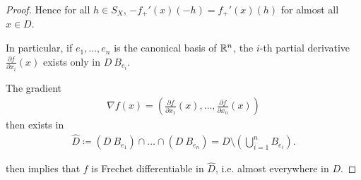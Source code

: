 \begin{proof}
  Hence for all $h \in S_X$, $-f_+'(x)(-h) = f_+'(x)(h)$ for almost all $x \in D$.

  In particular, if $e_1, \ldots, e_n$ is the canonical basis of $\mathbb R^n$, the $i$-th partial derivative $\frac{\partial f} {\partial x_i} (x)$ exists only in $D \ B_{e_i}$.

  The gradient
  \begin{align*}
    \nabla f(x) = \left( \frac{\partial f} {\partial x_1} (x), \ldots, \frac{\partial f} {\partial x_n} (x) \right)
  \end{align*}
  then exists in
  \begin{align*}
    \hat D \coloneqq (D \ B_{e_1}) \cap \ldots \cap (D \ B_{e_n}) = D \setminus \left( \bigcup_{i=1}^n B_{e_i} \right).
  \end{align*}

   then implies that $f$ is Frechet differentiable in $\hat D$, i.e. almost everywhere in $D$.
\end{proof}
